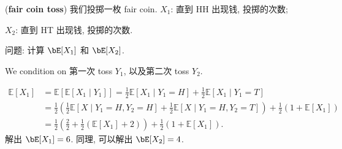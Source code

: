 \begin{example}
    (\textbf{fair coin toss})
我们投掷一枚 fair coin.
\(X_1\): 直到 HH 出现钱, 投掷的次数;

\(X_2\): 直到 HT 出现钱, 投掷的次数.

问题: 计算 \(\bE[X_1]\) 和 \(\bE[X_2]\).

\begin{solution}
    We condition on 第一次 toss \(Y_1\), 以及第二次 toss \(Y_2\).


\begin{align*}
\mathbb{E}\left[X_1\right] & =\mathbb{E}\left[\mathbb{E}\left[X_1 \mid Y_1\right]\right]=\frac{1}{2} \mathbb{E}\left[X_1 \mid Y_1=H\right]+\frac{1}{2} \mathbb{E}\left[X_1 \mid Y_1=T\right] \\
& =\frac{1}{2}\left(\frac{1}{2} \mathbb{E}\left[X \mid Y_1=H, Y_2=H\right]+\frac{1}{2} \mathbb{E}\left[X \mid Y_1=H, Y_2=T\right]\right)+\frac{1}{2}\left(1+\mathbb{E}\left[X_1\right]\right) \\
& =\frac{1}{2}\left(\frac{2}{2}+\frac{1}{2}\left(\mathbb{E}\left[X_1\right]+2\right)\right)+\frac{1}{2}\left(1+\mathbb{E}\left[X_1\right]\right) .
\end{align*}
解出 \(\bE[X_1] = 6\).
同理, 可以解出 \(\bE[X_2] = 4\).
\end{solution}

\end{example}




